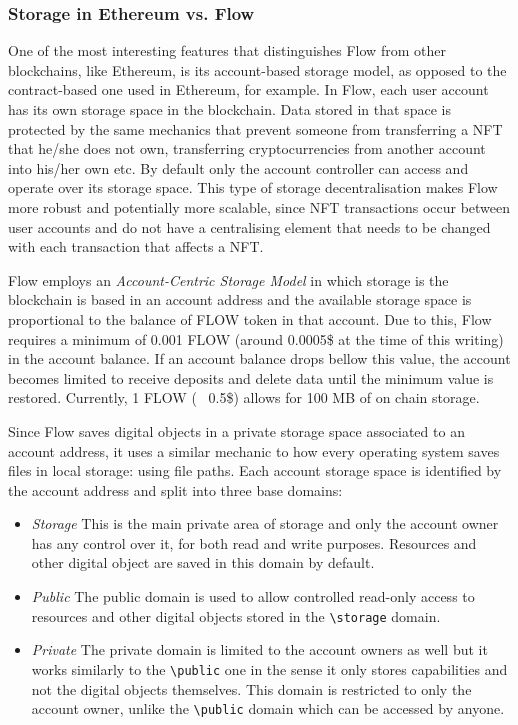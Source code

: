 \documentclass[../main.tex]{subfiles}
\begin{document}
\subsubsection{Storage in Ethereum vs. Flow}
\label{sec:storage_in_flow}
One of the most interesting features that distinguishes Flow from other blockchains, like Ethereum, is its account-based storage model, as opposed to the contract-based one used in Ethereum, for example. In Flow, each user account has its own storage space in the blockchain. Data stored in that space is protected by the same mechanics that prevent someone from transferring a NFT that he/she does not own, transferring cryptocurrencies from another account into his/her own etc. By default only the account controller can access and operate over its storage space. This type of storage decentralisation makes Flow more robust and potentially more scalable, since NFT transactions occur between user accounts and do not have a centralising element that needs to be changed with each transaction that affects a NFT.
\par
Flow employs an \textit{Account-Centric Storage Model} in which storage is the blockchain is based in an account address and the available storage space is proportional to the balance of FLOW token in that account. Due to this, Flow requires a minimum of 0.001 FLOW (around 0.0005\$ at the time of this writing) in the account balance. If an account balance drops bellow this value, the account becomes limited to receive deposits and delete data until the minimum value is restored. Currently, 1 FLOW (~ 0.5\$) allows for 100 MB of on chain storage.
\par
Since Flow saves digital objects in a private storage space associated to an account address, it uses a similar mechanic to how every operating system saves files in local storage: using file paths. Each account storage space is identified by the account address and split into three base domains:
\begin{itemize}
    \item {\textit{Storage}} This is the main private area of storage and only the account owner has any control over it, for both read and write purposes. Resources and other digital object are saved in this domain by default.
    \item {\textit{Public}} The public domain is used to allow controlled read-only access to resources and other digital objects stored in the \verb|\storage| domain.
    \item {\textit{Private}} The private domain is limited to the account owners as well but it works similarly to the \verb|\public| one in the sense it only stores capabilities and not the digital objects themselves. This domain is restricted to only the account owner, unlike the \verb|\public| domain which can be accessed by anyone.
\end{itemize}
\end{document}
